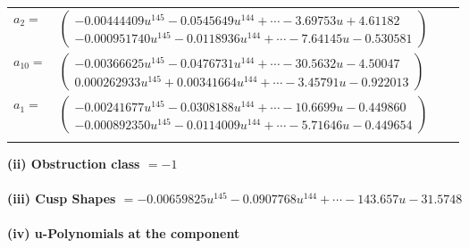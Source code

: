 \documentclass[1p]{elsarticle_modified}
\theoremstyle{definition}
\begin{document}
\begin{tabular}{m{7pt} m{180pt} m{7pt} m{180pt} }
\flushright $a_{2}=$&$\begin{pmatrix}-0.00444409 u^{145}-0.0545649 u^{144}+\cdots-3.69753 u+4.61182\\-0.000951740 u^{145}-0.0118936 u^{144}+\cdots-7.64145 u-0.530581\end{pmatrix}$ \\
\flushright $a_{10}=$&$\begin{pmatrix}-0.00366625 u^{145}-0.0476731 u^{144}+\cdots-30.5632 u-4.50047\\0.000262933 u^{145}+0.00341664 u^{144}+\cdots-3.45791 u-0.922013\end{pmatrix}$ \\
\flushright $a_{1}=$&$\begin{pmatrix}-0.00241677 u^{145}-0.0308188 u^{144}+\cdots-10.6699 u-0.449860\\-0.000892350 u^{145}-0.0114009 u^{144}+\cdots-5.71646 u-0.449654\end{pmatrix}$\\&\end{tabular}
\flushleft \textbf{(ii) Obstruction class $= -1$}\\~\\
\flushleft \textbf{(iii) Cusp Shapes $= -0.00659825 u^{145}-0.0907768 u^{144}+\cdots-143.657 u-31.5748$}\\~\\
\newpage\renewcommand{\arraystretch}{1}
\flushleft \textbf{(iv) u-Polynomials at the component}\newline \\
\end{document}
